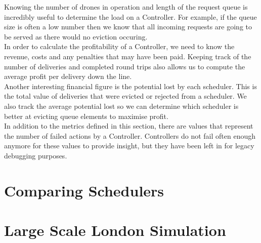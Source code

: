 \documentclass[a4paper,11pt,titlepage]{report}
\begin{document}
Knowing the number of drones in operation and length of the request queue is incredibly useful to determine the load on a Controller. For example, if the queue size is often a low number then we know that all incoming requests are going to be served as there would no eviction occuring.\\

In order to calculate the profitability of a Controller, we need to know the revenue, costs and any penalties that may have been paid. Keeping track of the number of deliveries and completed round trips also allows us to compute the average profit per delivery down the line.\\

Another interesting financial figure is the potential lost by each scheduler. This is the total value of deliveries that were evicted or rejected from a scheduler. We also track the average potential lost so we can determine which scheduler is better at evicting queue elements to maximise profit.\\

In addition to the metrics defined in this section, there are values that represent the number of failed actions by a Controller. Controllers do not fail often enough anymore for these values to provide insight, but they have been left in for legacy debugging purposes.

\section{Comparing Schedulers}

\section{Large Scale London Simulation}
\end{document}

